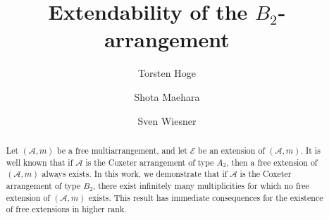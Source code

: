 \documentclass[12pt]{amsart}
\theoremstyle{definition}
\theoremstyle{remark}
\newcommand\CA{{\mathscr A}}
\newcommand\CE{{\mathscr E}}
\begin{document}
\title[Extendability of the $B_2$-arrangement]
{Extendability of the $B_2$-arrangement}


\author[T.~Hoge]{Torsten Hoge}
\address
{Fakult\"at f\"ur Mathematik,
	Ruhr-Universit\"at Bochum,
	D-44780 Bochum, Germany}

\author[S.~Maehara]{Shota Maehara}
\address
{Joint Graduate School of Mathematics for Innovation, Kyushu University, 744 Motooka Nishi-ku Fukuoka 819-0395, Japan}

\author[S.~Wiesner]{Sven Wiesner}
\address
{Fakult\"at f\"ur Mathematik,
	Ruhr-Universit\"at Bochum,
	D-44780 Bochum, Germany}

\begin{abstract}
    Let $(\CA,m)$ be a free multiarrangement, and let $\CE$ be an extension of $(\CA,m)$. It is well known that if $\CA$ is the Coxeter arrangement of type $A_2$, then a free extension of $(\CA,m)$ always exists. In this work, we demonstrate that if $\CA$ is the Coxeter arrangement of type $B_2$, there exist infinitely many multiplicities for which no free extension of $(\CA,m)$ exists. This result has immediate consequences for the existence of free extensions in higher rank.
\end{abstract}

\maketitle
\end{document}
